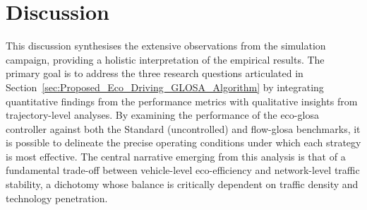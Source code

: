 \section{Discussion}
\label{sec:Results_Discussion}

This discussion synthesises the extensive observations from the simulation campaign, providing a holistic interpretation of the empirical results. The primary goal is to address the three research questions articulated in Section~\vref{sec:Proposed_Eco_Driving_GLOSA_Algorithm} by integrating quantitative findings from the performance metrics with qualitative insights from trajectory-level analyses. By examining the performance of the \ac{eco-glosa} controller against both the Standard (uncontrolled) and \ac{flow-glosa} benchmarks, it is possible to delineate the precise operating conditions under which each strategy is most effective. The central narrative emerging from this analysis is that of a fundamental trade-off between vehicle-level eco-efficiency and network-level traffic stability, a dichotomy whose balance is critically dependent on traffic density and technology penetration.

